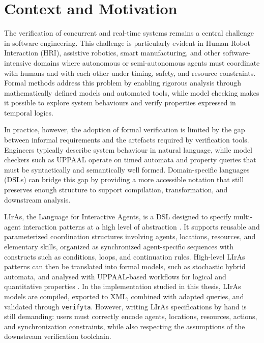 %   

\section{Context and Motivation}
\label{sec:context_motivation}

The verification of concurrent and real-time systems remains a central challenge in software engineering.
This challenge is particularly evident in Human-Robot Interaction (HRI), assistive robotics, smart manufacturing, and other software-intensive domains where autonomous or semi-autonomous agents must coordinate with humans and with each other under timing, safety, and resource constraints.
Formal methods address this problem by enabling rigorous analysis through mathematically defined models and automated tools, while model checking makes it possible to explore system behaviours and verify properties expressed in temporal logics.

In practice, however, the adoption of formal verification is limited by the gap between informal requirements and the artefacts required by verification tools.
Engineers typically describe system behaviour in natural language, while model checkers such as UPPAAL operate on timed automata and property queries that must be syntactically and semantically well formed.
Domain-specific languages (DSLs) can bridge this gap by providing a more accessible notation that still preserves enough structure to support compilation, transformation, and downstream analysis.

LIrAs, the Language for Interactive Agents, is a DSL designed to specify multi-agent interaction patterns at a high level of abstraction \cite{tagliaferro2026liras}.
It supports reusable and parameterized coordination structures involving agents, locations, resources, and elementary skills, organized as synchronized agent-specific sequences with constructs such as conditions, loops, and continuation rules.
High-level LIrAs patterns can then be translated into formal models, such as stochastic hybrid automata, and analysed with UPPAAL-based workflows for logical and quantitative properties \cite{tagliaferro2026liras}.
In the implementation studied in this thesis, LIrAs models are compiled, exported to XML, combined with adapted queries, and validated through \texttt{verifyta}.
However, writing LIrAs specifications by hand is still demanding: users must correctly encode agents, locations, resources, actions, and synchronization constraints, while also respecting the assumptions of the downstream verification toolchain.

